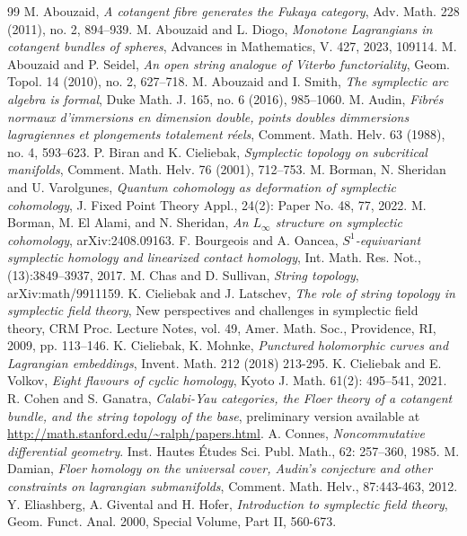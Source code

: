 \documentclass[a4paper]{article}
\numberwithin{equation}{section}
\begin{document}
\begin{thebibliography}{99}
M. Abouzaid, \textit{A cotangent fibre generates the Fukaya category}, Adv. Math. 228 (2011), no. 2, 894--939.
M. Abouzaid and L. Diogo, \textit{Monotone Lagrangians in cotangent bundles of spheres}, Advances in Mathematics, V. 427, 2023, 109114.
M. Abouzaid and P. Seidel, \textit{An open string analogue of Viterbo functoriality}, Geom. Topol. 14 (2010), no. 2, 627--718.
M. Abouzaid and I. Smith, \textit{The symplectic arc algebra is formal}, Duke Math. J. 165, no. 6 (2016), 985--1060.
M. Audin, \textit{Fibr\'{e}s normaux d’immersions en dimension double, points doubles dimmersions lagragiennes et plongements totalement r\'{e}els}, Comment. Math. Helv. 63 (1988), no. 4, 593--623.
P. Biran and K. Cieliebak, \textit{Symplectic topology on subcritical manifolds}, Comment. Math. Helv. 76 (2001), 712--753.
M. Borman, N. Sheridan and U. Varolgunes, \textit{Quantum cohomology as deformation of symplectic cohomology}, J. Fixed Point Theory Appl., 24(2): Paper No. 48, 77, 2022.
M. Borman, M. El Alami, and N. Sheridan, \textit{An $L_\infty$ structure on symplectic cohomology}, arXiv:2408.09163.
F. Bourgeois and A. Oancea, \textit{$S^1$-equivariant symplectic homology and linearized contact homology}, Int. Math. Res. Not., (13):3849--3937, 2017.
M. Chas and D. Sullivan, \textit{String topology}, arXiv:math/9911159.
K. Cieliebak and J. Latschev, \textit{The role of string topology in symplectic field theory}, New perspectives and challenges in symplectic field theory, CRM Proc. Lecture Notes, vol. 49, Amer. Math. Soc., Providence, RI, 2009, pp. 113--146.
K. Cieliebak, K. Mohnke, \textit{Punctured holomorphic curves and Lagrangian embeddings}, Invent. Math. 212 (2018) 213-295.
K. Cieliebak and E. Volkov, \textit{Eight flavours of cyclic homology}, Kyoto J. Math. 61(2): 495--541, 2021.
R. Cohen and S. Ganatra, \textit{Calabi-Yau categories, the Floer theory of a cotangent bundle, and the string topology of the base}, preliminary version available at \url{http://math.stanford.edu/~ralph/papers.html}.
A. Connes, \textit{Noncommutative differential geometry}. Inst. Hautes Études Sci. Publ. Math., 62: 257--360, 1985.
M. Damian, \textit{Floer homology on the universal cover, Audin’s conjecture and other constraints on lagrangian submanifolds}, Comment. Math. Helv., 87:443-463, 2012.
Y. Eliashberg, A. Givental and H. Hofer, \textit{Introduction to symplectic field theory}, Geom. Funct. Anal. 2000, Special Volume, Part II, 560-673.

\end{thebibliography}
\end{document}
